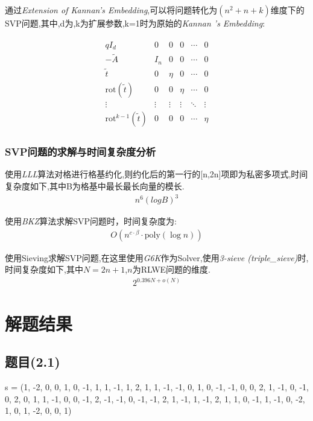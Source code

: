 \documentclass[12pt,a4paper]{article}
\numberwithin{equation}{section}
\begin{document}
通过\textit{Extension of Kannan’s Embedding}\cite{albrecht2018},可以将问题转化为$(n^2+n+k)$维度下的SVP问题,其中,d为,k为扩展参数,k=1时为原始的\textit{Kannan 's Embedding}:

\begin{align}
\begin{matrix}
qI_d & 0 & 0 & 0 & \cdots & 0 \\
-\tilde{A} & I_n & 0 & 0 & \cdots & 0 \\
\tilde{t} & 0 & \eta & 0 & \cdots & 0 \\
\text{rot}(\tilde{t}) & 0 & 0 & \eta & \cdots & 0 \\
\vdots & \vdots & \vdots & \vdots & \ddots & \vdots \\
\text{rot}^{k-1}(\tilde{t}) & 0 & 0 & 0 & \cdots & \eta
\end{matrix}
\end{align}

\subsubsection{SVP问题的求解与时间复杂度分析}

使用\textit{LLL}算法\cite{ajtai1998}对格进行格基约化,则约化后的第一行的[n,2n]项即为私密多项式,时间复杂度如下,其中B为格基中最长最长向量的模长\cite{adleman1981}.
\begin{align}
n^6 (logB)^3
\end{align}

使用\textit{BKZ}算法求解SVP问题时，时间复杂度为:
\begin{align}
O\left(n^{c \cdot \beta} \cdot \text{poly}(\log n)\right)
\end{align}

使用Sieving求解SVP问题,在这里使用\textit{G6K}\cite{cryptoeprint:2019/089}作为Solver,使用\textit{3-sieve (triple\_sieve)}时,
时间复杂度如下,其中$N=2n+1$,$n$为RLWE问题的维度.
\begin{align}
2^{0.396N+o(N)}
\end{align}


\section{解题结果}

\subsection{题目(2.1)}

s = (1, -2, 0, 0, 1, 0, -1, 1, 1, -1, 1, 2, 1, 1,
-1, -1, 0, 1, 0, -1, -1, 0, 0, 2, 1, -1, 0, -1, 0, 2, 0, 1,
1, -1, 0, 0, -1, 2, -1, -1, 0, -1, -1, 2, 1, -1, 1, -1, 2, 1, 1, 0,
-1, 1, -1, 0, -2, 1, 0, 1, -2, 0, 0, 1)
\end{document}
